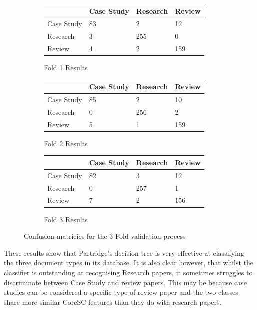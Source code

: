 \begin{figure}[!h]

\centering

\begin{subfigure}[b]{\textwidth}

\caption{Fold 1 Results}
\centering
\begin{tabular}{| l || l | l | l |}
\hline
	&	Case Study&	Research&	Review\\
\hline
\hline
Case Study&	83&		2&		12\\
\hline
Research&	3&		255&		0\\
\hline
Review&		4&		2&		159\\
\hline

\end{tabular}
\end{subfigure}


\begin{subfigure}[b]{\textwidth}

\caption{Fold 2 Results}
\centering
\begin{tabular}{| l || l | l | l |}
\hline
&	        Case Study&     Research&	Review\\
\hline
\hline
Case Study&     85    &         2&		10\\
\hline
Research&	0   &		256&		2\\
\hline
Review&		5&		1&		159\\
\hline
\end{tabular}

\end{subfigure}

\begin{subfigure}[b]{\textwidth}

\caption{Fold 3 Results}
\centering
\begin{tabular}{| l || l | l | l |}
\hline
&		Case Study&	Research&	Review\\
\hline
\hline
Case Study&	82&		3	&	12 \\
Research&	0&		257	&	1\\
Review&		7&		2	&	156\\
\hline
\end{tabular}

\end{subfigure}

\caption{ Confusion matricies for the 3-Fold validation process}
\label{fig:conf_matrices}

\end{figure}

These results show that Partridge's decision tree is very effective at
classifying the three document types in its database. It is also clear however,
that whilst the classifier is outstanding at recognising Research papers, it
sometimes struggles to discriminate between Case Study and review papers. This
may be because case studies can be considered a specific type of review paper
and the two classes share more similar CoreSC features than they do with
research papers.  

